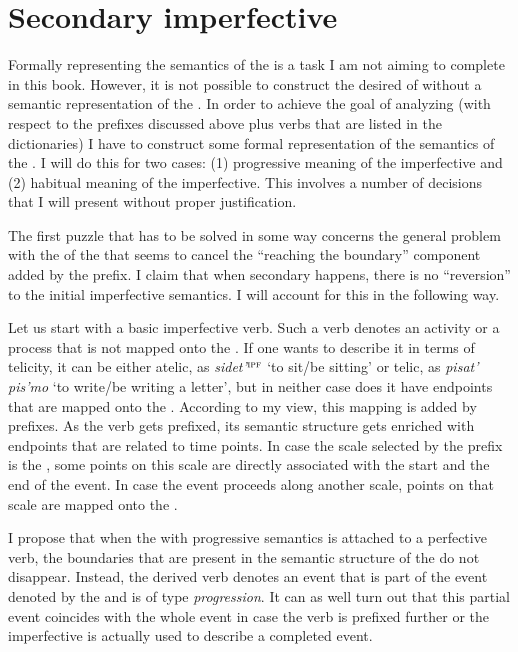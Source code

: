 \section{Secondary imperfective}\label{section:imperfective}
Formally representing the semantics of the  is a task I am not aiming to complete in this book. However, it is not possible to construct the desired  of  without a semantic representation of the . In order to achieve the goal of analyzing  (with respect to the prefixes discussed above plus verbs that are listed in the dictionaries) I have to construct some formal representation of the semantics of the . I will do this for two cases: (1) progressive meaning of the imperfective and (2) habitual meaning of the imperfective. This involves a number of decisions that I will present without proper justification.

The first puzzle that has to be solved in some way concerns the general problem with the  of the  that seems to cancel the ``reaching the boundary'' component added by the prefix. I claim that when secondary  happens, there is no ``reversion'' to the initial imperfective semantics. I will account for this in the following way. 

Let us start with a basic imperfective verb. Such a verb denotes an activity or a process that is not mapped onto the . If one wants to describe it in terms of telicity, it can be either atelic, as \textit{sidet'}$^{\textsc{ipf}}$ `to sit/be sitting' or telic, as \textit{pisat' pis'mo} `to write/be writing a letter', but in neither case does it have endpoints that are mapped onto the . According to my view, this mapping is added by prefixes. As the verb gets prefixed, its semantic structure gets enriched with endpoints that are related to time points. In case the scale selected by the prefix is the , some points on this scale are directly associated with the start and the end of the event. In case the event proceeds along another scale, points on that scale are mapped onto the . 

I propose that when the  with progressive semantics is attached to a perfective verb, the boundaries that are present in the semantic structure of the  do not disappear. Instead, the derived verb denotes an event that is part of the event denoted by the  and is of type \textit{progression}. It can as well turn out that this partial event coincides with the whole event in case the verb is prefixed further or the imperfective is actually used to describe a completed event.

